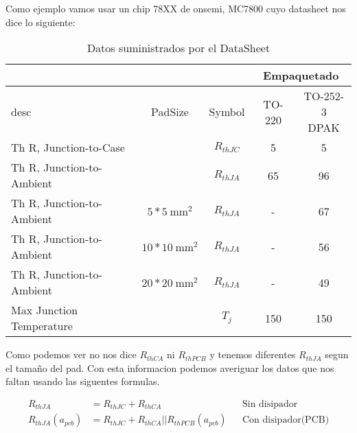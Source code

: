 Como ejemplo vamos usar un chip 78XX de onsemi, MC7800 cuyo datasheet nos dice
lo siguiente:
\begin{table}[H]
    \centering
    \renewcommand\theadfont{\bfseries}
    \setlength{\tabcolsep}{10pt}
    \renewcommand{\arraystretch}{1.5}
    \begin{tabular}{|l|c|c|c|c|}
        \hline
                                  &                          &            & \multicolumn{2}{|c|}{Empaquetado}                      \\ \hline
        desc                      & PadSize                  & Symbol     & TO-220                            & \makecell{TO-252-3 \\ DPAK } \\ \hline
        Th R, Junction-to-Case    &                          & $R_{thJC}$ & 5                                 & 5                  \\ \hline
        Th R, Junction-to-Ambient &                          & $R_{thJA}$ & 65                                & 96                 \\ \hline
        Th R, Junction-to-Ambient & $5*\SI{5}{\square\mm}$   & $R_{thJA}$ & -                                 & 67                 \\ \hline
        Th R, Junction-to-Ambient & $10*\SI{10}{\square\mm}$ & $R_{thJA}$ & -                                 & 56                 \\ \hline
        Th R, Junction-to-Ambient & $20*\SI{20}{\square\mm}$ & $R_{thJA}$ & -                                 & 49                 \\ \hline
        Max Junction Temperature  &                          & $T_j$      & 150                               & 150                \\
        \hline
    \end{tabular}
    \caption{Datos suministrados por el DataSheet}
    \label{tab:MC7800_ds_thermal_data}
\end{table}

Como podemos ver no nos dice $R_{thCA}$ ni $R_{thPCB}$ y tenemos diferentes $R_{thJA}$
segun el tamaño del pad. Con esta informacion podemos averiguar los datos que nos faltan
usando las siguentes formulas.


\begin{subequations}
    \label{eq:basicRth}
    \begin{align}
        \label{eq:RthSinDisipador} R_{thJA}          & =R_{thJC}+R_{thCA}                     &  & \text{Sin disipador }     \\
        \label{eq:RthConDisipador} R_{thJA}(a_{pcb}) & =R_{thJC}+R_{thCA}||R_{thPCB}(a_{pcb}) &  & \text{Con disipador(PCB)}
    \end{align}
\end{subequations}

